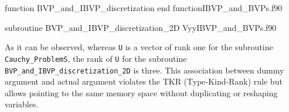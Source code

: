 \vspace{0.5cm} 
{function BVP_and_IBVP_discretization}
{end function}{IBVP_and_BVPs.f90}


\vspace{0.5cm} 
{subroutine BVP_and_IBVP_discretization_2D}
{Vyy}{IBVP_and_BVPs.f90}


As it can be observed, whereas \verb|U| is a vector of rank one for the subroutine \verb|Cauchy_ProblemS|, the rank of \verb|U| for the 
subroutine  \verb|BVP_and_IBVP_discretization_2D| is three. 
This association between dummy argument and actual argument violates the TKR (Type-Kind-Rank) rule  but allows pointing to the same memory space without duplicating or reshaping variables.   

